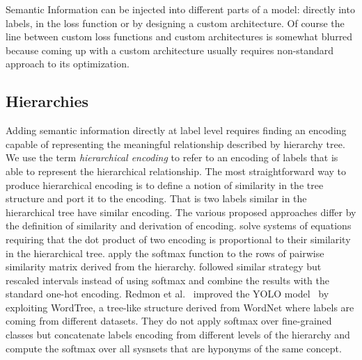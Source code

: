 Semantic Information can be injected into different parts of a model: directly into
labels, in the loss function or by designing a custom architecture. Of course
the line between custom loss functions and custom architectures is somewhat
blurred because coming up with a custom architecture usually requires
non-standard approach to its optimization.

\subsection{Hierarchies}
\label{subsec:hierarchies}

Adding semantic information directly at label level requires finding an
encoding capable of representing the meaningful relationship described by
hierarchy tree. We use the term \emph{hierarchical encoding} to refer to an
encoding of labels that is able to represent the hierarchical relationship. The
most straightforward way to produce hierarchical encoding is to define a
notion of similarity in the tree structure and port it to the encoding. That is
two labels similar in the hierarchical tree have similar encoding. The various
proposed approaches differ by the definition of similarity and derivation
of encoding. \cite{HierarchyBasedBarz2018} solve systems of equations
requiring that the dot product of two encoding is proportional to their
similarity in the hierarchical tree. \cite{MakingBetterMBertin2019} apply the
softmax function to the rows of pairwise similarity matrix derived from the
hierarchy. \cite{BeyondOneHotPerott2023} followed similar strategy but rescaled
intervals instead of using softmax and combine the results with the standard
one-hot encoding. Redmon et al.~\cite{Yolo9000BetteRedmon2016} improved the
YOLO model~\cite{YouOnlyLookORedmon2015} by exploiting WordTree, a tree-like
structure derived from WordNet where labels are coming from different datasets.
They do not apply softmax over fine-grained classes but concatenate labels
encoding from different levels of the hierarchy and compute the softmax over
all sysnsets that are hyponyms of the same concept.

